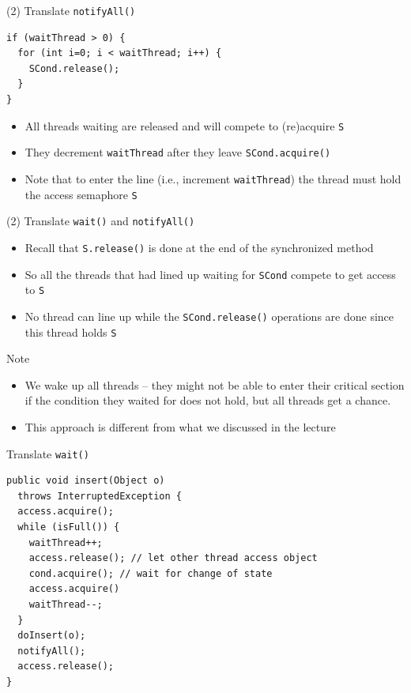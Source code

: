 \begin{frame}[fragile]{(2) Translate \lstinline!notifyAll()!}
\begin{lstlisting}
if (waitThread > 0) {
  for (int i=0; i < waitThread; i++) { 
    SCond.release();
  }
}	
\end{lstlisting}


  \begin{itemize}
  \item All threads waiting are released and will compete to
    (re)acquire \lstinline!S!
  \item They decrement \lstinline!waitThread! after they leave
    \lstinline!SCond.acquire()!
  \item Note that to enter the line (i.e., increment
    \lstinline!waitThread!) the thread must hold the access semaphore
    \lstinline!S!
  \end{itemize}
\end{frame}

\begin{frame}{(2) Translate \lstinline!wait()! and \lstinline!notifyAll()!}
  \begin{itemize}
  \item Recall that \lstinline!S.release()! is done at the end of the
    synchronized method
  \item So all the threads that had lined up waiting for
    \lstinline!SCond! compete to get access to \lstinline!S!
  \item No thread can line up while the \lstinline!SCond.release()!
    operations are done since this thread holds \lstinline!S!
  \end{itemize}
\end{frame}

\begin{frame}{Note}
  \begin{itemize}
  \item We wake up all threads -- they might not be able to enter
    their critical section if the condition they waited for does not
    hold, but all threads get a chance.
  \item This approach is different from what we discussed in the
    lecture
  \end{itemize}
\end{frame}

\begin{frame}[fragile]{Translate \lstinline!wait()!}
\begin{lstlisting}[basicstyle=\fontsize{9}{11}\selectfont\ttfamily]
public void insert(Object o)
  throws InterruptedException {
  access.acquire();
  while (isFull()) {
    waitThread++;
    access.release(); // let other thread access object
    cond.acquire(); // wait for change of state
    access.acquire()
    waitThread--;
  }
  doInsert(o);	
  notifyAll();
  access.release();
}
\end{lstlisting}
\end{frame}

